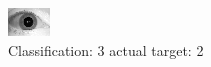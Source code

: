 \begin{figure}[h!]
\begin{center}
\includegraphics[width=0.60\columnwidth]{figures/ID1758_class_3_target_2.png}
\end{center}
\caption{ Classification: 3 actual target: 2}
\label{fig:ID1758_class_3_target_2}
\end{figure}
